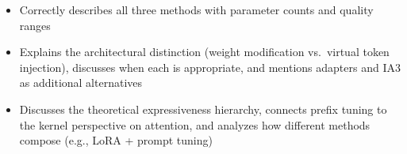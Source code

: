 \begin{interviewq}
\goodgreat
\begin{itemize}
    \item {} Correctly describes all three methods with parameter counts
          and quality ranges
    \item {} Explains the architectural distinction (weight modification
          vs.\ virtual token injection), discusses when each is appropriate, and mentions
          adapters and IA3 as additional alternatives
    \item {} Discusses the theoretical expressiveness hierarchy, connects
          prefix tuning to the kernel perspective on attention, and analyzes how
          different methods compose (e.g., LoRA + prompt tuning)
\end{itemize}

\end{interviewq}

\bigskip

